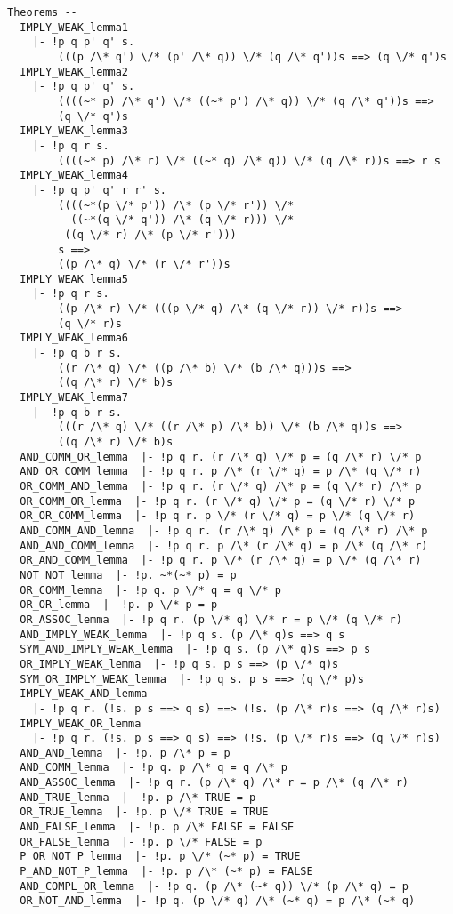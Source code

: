 {\begin{verbatim}
Theorems --
  IMPLY_WEAK_lemma1
    |- !p q p' q' s.
        (((p /\* q') \/* (p' /\* q)) \/* (q /\* q'))s ==> (q \/* q')s
  IMPLY_WEAK_lemma2
    |- !p q p' q' s.
        ((((~* p) /\* q') \/* ((~* p') /\* q)) \/* (q /\* q'))s ==>
        (q \/* q')s
  IMPLY_WEAK_lemma3
    |- !p q r s.
        ((((~* p) /\* r) \/* ((~* q) /\* q)) \/* (q /\* r))s ==> r s
  IMPLY_WEAK_lemma4
    |- !p q p' q' r r' s.
        ((((~*(p \/* p')) /\* (p \/* r')) \/*
          ((~*(q \/* q')) /\* (q \/* r))) \/*
         ((q \/* r) /\* (p \/* r')))
        s ==>
        ((p /\* q) \/* (r \/* r'))s
  IMPLY_WEAK_lemma5
    |- !p q r s.
        ((p /\* r) \/* (((p \/* q) /\* (q \/* r)) \/* r))s ==>
        (q \/* r)s
  IMPLY_WEAK_lemma6
    |- !p q b r s.
        ((r /\* q) \/* ((p /\* b) \/* (b /\* q)))s ==>
        ((q /\* r) \/* b)s
  IMPLY_WEAK_lemma7
    |- !p q b r s.
        (((r /\* q) \/* ((r /\* p) /\* b)) \/* (b /\* q))s ==>
        ((q /\* r) \/* b)s
  AND_COMM_OR_lemma  |- !p q r. (r /\* q) \/* p = (q /\* r) \/* p
  AND_OR_COMM_lemma  |- !p q r. p /\* (r \/* q) = p /\* (q \/* r)
  OR_COMM_AND_lemma  |- !p q r. (r \/* q) /\* p = (q \/* r) /\* p
  OR_COMM_OR_lemma  |- !p q r. (r \/* q) \/* p = (q \/* r) \/* p
  OR_OR_COMM_lemma  |- !p q r. p \/* (r \/* q) = p \/* (q \/* r)
  AND_COMM_AND_lemma  |- !p q r. (r /\* q) /\* p = (q /\* r) /\* p
  AND_AND_COMM_lemma  |- !p q r. p /\* (r /\* q) = p /\* (q /\* r)
  OR_AND_COMM_lemma  |- !p q r. p \/* (r /\* q) = p \/* (q /\* r)
  NOT_NOT_lemma  |- !p. ~*(~* p) = p
  OR_COMM_lemma  |- !p q. p \/* q = q \/* p
  OR_OR_lemma  |- !p. p \/* p = p
  OR_ASSOC_lemma  |- !p q r. (p \/* q) \/* r = p \/* (q \/* r)
  AND_IMPLY_WEAK_lemma  |- !p q s. (p /\* q)s ==> q s
  SYM_AND_IMPLY_WEAK_lemma  |- !p q s. (p /\* q)s ==> p s
  OR_IMPLY_WEAK_lemma  |- !p q s. p s ==> (p \/* q)s
  SYM_OR_IMPLY_WEAK_lemma  |- !p q s. p s ==> (q \/* p)s
  IMPLY_WEAK_AND_lemma
    |- !p q r. (!s. p s ==> q s) ==> (!s. (p /\* r)s ==> (q /\* r)s)
  IMPLY_WEAK_OR_lemma
    |- !p q r. (!s. p s ==> q s) ==> (!s. (p \/* r)s ==> (q \/* r)s)
  AND_AND_lemma  |- !p. p /\* p = p
  AND_COMM_lemma  |- !p q. p /\* q = q /\* p
  AND_ASSOC_lemma  |- !p q r. (p /\* q) /\* r = p /\* (q /\* r)
  AND_TRUE_lemma  |- !p. p /\* TRUE = p
  OR_TRUE_lemma  |- !p. p \/* TRUE = TRUE
  AND_FALSE_lemma  |- !p. p /\* FALSE = FALSE
  OR_FALSE_lemma  |- !p. p \/* FALSE = p
  P_OR_NOT_P_lemma  |- !p. p \/* (~* p) = TRUE
  P_AND_NOT_P_lemma  |- !p. p /\* (~* p) = FALSE
  AND_COMPL_OR_lemma  |- !p q. (p /\* (~* q)) \/* (p /\* q) = p
  OR_NOT_AND_lemma  |- !p q. (p \/* q) /\* (~* q) = p /\* (~* q)

\end{verbatim}}
